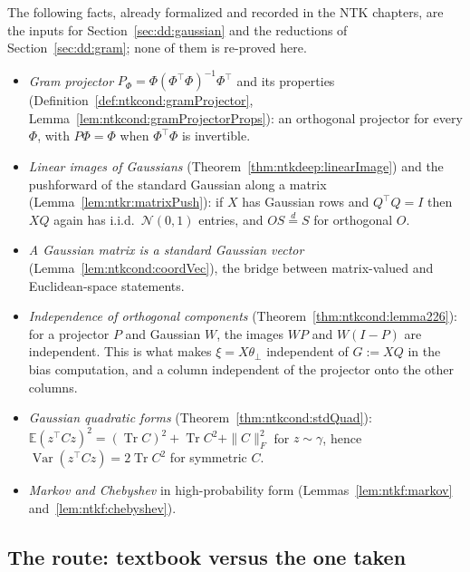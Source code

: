 \begin{remark}\label{rmk:dd:ntkBackground}
The following facts, already formalized and recorded in the NTK chapters, are the inputs for Section~\ref{sec:dd:gaussian} and the reductions of Section~\ref{sec:dd:gram}; none of them is re-proved here.
\begin{itemize}
  \item \emph{Gram projector} $P_\Phi=\Phi(\Phi^\top\Phi)^{-1}\Phi^\top$ and its properties (Definition~\ref{def:ntkcond:gramProjector},
  Lemma~\ref{lem:ntkcond:gramProjectorProps}): an orthogonal projector for every $\Phi$, with $P\Phi=\Phi$ when $\Phi^\top\Phi$ is invertible.
  \item \emph{Linear images of Gaussians} (Theorem~\ref{thm:ntkdeep:linearImage}) and the pushforward of the standard Gaussian along a matrix
  (Lemma~\ref{lem:ntkr:matrixPush}): if $X$ has Gaussian rows and $Q^\top Q=I$ then $XQ$ again has i.i.d.\ $\mathcal N(0,1)$ entries, and
  $OS\overset d=S$ for orthogonal $O$.
  \item \emph{A Gaussian matrix is a standard Gaussian vector} (Lemma~\ref{lem:ntkcond:coordVec}), the bridge between matrix-valued and
  Euclidean-space statements.
  \item \emph{Independence of orthogonal components} (Theorem~\ref{thm:ntkcond:lemma226}): for a projector $P$ and Gaussian $W$, the images
  $WP$ and $W(I-P)$ are independent. This is what makes $\xi=X\theta_\perp$ independent of $G:=XQ$ in the bias computation, and a column independent of the
  projector onto the other columns.
  \item \emph{Gaussian quadratic forms} (Theorem~\ref{thm:ntkcond:stdQuad}): $\mathbb E(z^\top Cz)^2=(\operatorname{Tr}C)^2+\operatorname{Tr}C^2+\|C\|_F^2$ for
  $z\sim\gamma$, hence $\operatorname{Var}(z^\top Cz)=2\operatorname{Tr}C^2$ for symmetric $C$.
  \item \emph{Markov and Chebyshev} in high-probability form (Lemmas~\ref{lem:ntkf:markov} and~\ref{lem:ntkf:chebyshev}).
\end{itemize}
\end{remark}

\subsection{The route: textbook versus the one taken}

